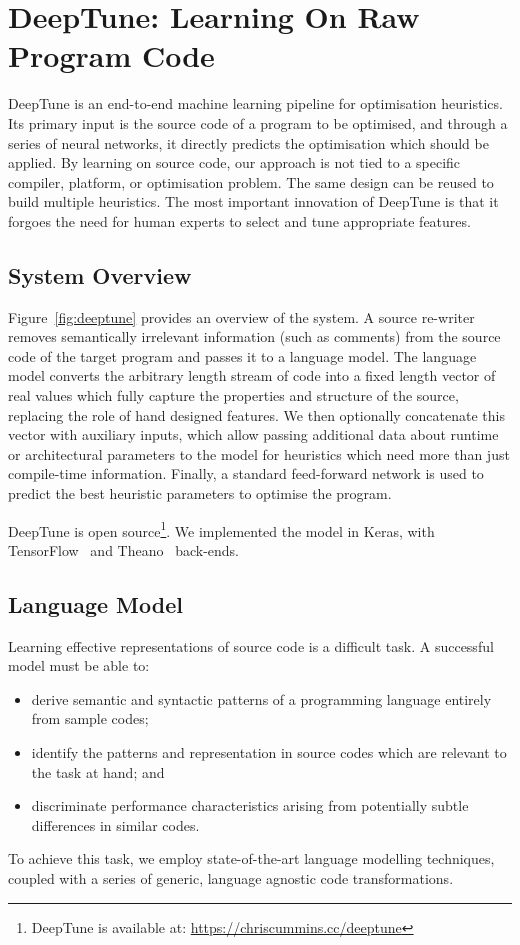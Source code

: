 \section{DeepTune: Learning On Raw Program Code} \label{sec:DeepTune}



DeepTune is an end-to-end machine learning pipeline for optimisation heuristics. Its primary input is the source code of a program to be optimised, and through a series of neural networks, it directly predicts the optimisation which should be applied. By learning on source code, our approach is not tied to a specific compiler, platform, or optimisation problem. The same design can be reused to build multiple heuristics. The most important innovation of DeepTune is that it forgoes the need for human experts to select and tune appropriate features.


\subsection{System Overview}

Figure~\ref{fig:deeptune} provides an overview of the system. A source re-writer removes semantically irrelevant information (such as comments) from the source code of the target program and passes it to a language model. The language model converts the arbitrary length stream of code into a fixed length vector of real values which fully capture the properties and structure of the source, replacing the role of hand designed features. We then optionally concatenate this vector with auxiliary inputs, which allow passing additional data about runtime or architectural parameters to the model for heuristics which need more than just compile-time information. Finally, a standard feed-forward network is used to predict the best heuristic parameters to optimise the program.

DeepTune is open source\footnote{DeepTune is available at: \url{https://chriscummins.cc/deeptune}}. We implemented the model in Keras, with TensorFlow~\cite{Abadi} and Theano~\cite{Bergstra2011} back-ends.


\subsection{Language Model}

Learning effective representations of source code is a difficult task. A successful model must be able to:
%
\begin{itemize}
  \item derive semantic and syntactic patterns of a programming language entirely from sample codes;
  \item identify the patterns and representation in source codes which are relevant to the task at hand; and
  \item discriminate performance characteristics arising from potentially subtle differences in similar codes.
\end{itemize}
%
To achieve this task, we employ state-of-the-art language modelling techniques, coupled with a series of generic, language agnostic code transformations.


